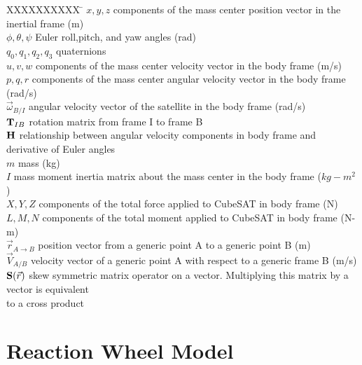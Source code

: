 \documentclass{article}
\begin{document}
\begin{tabbing}
  XXXXXXXXXX \= \kill%
  $x,y,z$ \> components of the mass center position vector in the
  inertial frame (m)  \\
  $\phi,\theta,\psi$ \> Euler roll,pitch, and yaw angles (rad) \\
  $q_0,q_1,q_2,q_3$ \>  quaternions \\  
  $u,v,w$ \> components of the mass center velocity vector in the
  body frame (m/s)  \\
  $p,q,r$ \> components of the mass center angular velocity vector in the
  body frame (rad/s)  \\
  $\vec{\omega}_{B/I}$ \> angular velocity vector of the satellite in
  the body frame (rad/s) \\
  ${\bf T}_{IB}$ \> rotation matrix from frame I to frame B \\
  ${\bf H}$ \> relationship between angular velocity components in
  body frame and derivative of Euler angles \\
  $m$ \> mass (kg) \\
  $I$ \> mass moment inertia matrix about the mass center
  in the body frame ($kg-m^2$)  \\
  $X,Y,Z$ \> components of the total force applied to CubeSAT in
  body frame (N)  \\
  $L,M,N$ \> components of the total moment applied to CubeSAT in
  body frame (N-m)  \\
  ${\vec r}_{A\rightarrow B}$ \> position vector from a generic point A
  to a generic point B (m) \\
  ${\vec V}_{A/B}$ \> velocity vector of a generic point A
  with respect to a generic frame B (m/s) \\
  ${\bf S}(\vec{r})$ \> skew symmetric matrix operator on a
  vector. Multiplying this matrix by a vector is equivalent \\
  \> to a cross product\\
\end{tabbing}


\section{Reaction Wheel Model}
\end{document}
